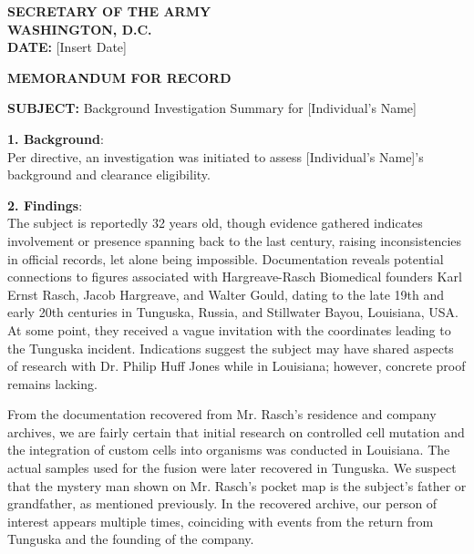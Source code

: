 \documentclass[a4paper,12pt]{letter}
\begin{document}
	
	\begin{center}
		\textbf{SECRETARY OF THE ARMY} \\
		\textbf{WASHINGTON, D.C.} \\
		\textbf{DATE:} [Insert Date] \\
	\end{center}
	
	\vspace{1cm}
	
	\noindent
	\textbf{MEMORANDUM FOR RECORD} \\
	
	\vspace{0.5cm}
	
	\noindent
	\textbf{SUBJECT:} Background Investigation Summary for [Individual's Name] \\
	
	\vspace{0.5cm}
	
	\noindent
	\textbf{1. Background}: \\
	Per directive, an investigation was initiated to assess [Individual’s Name]'s background and clearance eligibility. 
	
	\vspace{0.5cm}
	
	\noindent
	\textbf{2. Findings}: \\
	The subject is reportedly 32 years old, though evidence gathered indicates involvement or presence spanning back to the last century, raising inconsistencies in official records, let alone being impossible. Documentation reveals potential connections to figures associated with Hargreave-Rasch Biomedical founders Karl Ernst Rasch, Jacob Hargreave, and Walter Gould, dating to the late 19th and early 20th centuries in Tunguska, Russia, and Stillwater Bayou, Louisiana, USA. At some point, they received a vague invitation with the coordinates leading to the Tunguska incident. Indications suggest the subject may have shared aspects of research with Dr. Philip Huff Jones while in Louisiana; however, concrete proof remains lacking.
	
	From the documentation recovered from Mr. Rasch's residence and company archives, we are fairly certain that initial research on controlled cell mutation and the integration of custom cells into organisms was conducted in Louisiana. The actual samples used for the fusion were later recovered in Tunguska. We suspect that the mystery man shown on Mr. Rasch’s pocket map is the subject’s father or grandfather, as mentioned previously. In the recovered archive, our person of interest appears multiple times, coinciding with events from the return from Tunguska and the founding of the company.
	
\end{document}
